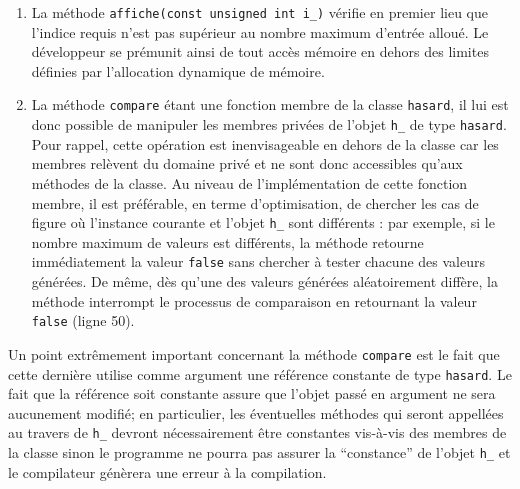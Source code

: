 \documentclass{book}
\begin{document}
\begin{correction}
\begin{enumerate}
\item La méthode \texttt{affiche(const unsigned int i\_)} vérifie en premier lieu que
l'indice requis n'est pas supérieur au nombre maximum d'entrée alloué. Le
développeur se prémunit ainsi de tout accès mémoire en dehors des limites
définies par l'allocation dynamique de mémoire.

\item La méthode \texttt{compare} étant une fonction membre de la classe \texttt{hasard}, il lui est
donc possible de manipuler les membres privées de l'objet \texttt{h\_} de type
\texttt{hasard}. Pour rappel, cette opération est inenvisageable en dehors de la
classe car les membres relèvent du domaine privé et ne sont donc accessibles
qu'aux méthodes de la classe. Au niveau de l'implémentation de cette fonction
membre, il est préférable, en terme d'optimisation, de chercher les cas de
figure où l'instance courante et l'objet \texttt{h\_} sont différents : par exemple, si
le nombre maximum de valeurs est différents, la méthode retourne
immédiatement la valeur \texttt{false} sans chercher à tester chacune des valeurs
générées. De même, dès qu'une des valeurs générées aléatoirement diffère, la
méthode interrompt le processus de comparaison en retournant la valeur \texttt{false}
(ligne 50).
\end{enumerate}

Un point extrêmement important concernant la méthode \texttt{compare} est le fait que
cette dernière utilise comme argument une référence constante de type \texttt{hasard}. Le
fait que la référence soit constante assure que l'objet passé en argument ne
sera aucunement modifié; en particulier, les éventuelles méthodes qui seront
appellées au travers de \texttt{h\_} devront nécessairement être constantes vis-à-vis des
membres de la classe sinon le programme ne pourra pas assurer la ``constance'' de
l'objet \texttt{h\_} et le compilateur génèrera une erreur à la compilation.


\end{correction}
\end{document}
